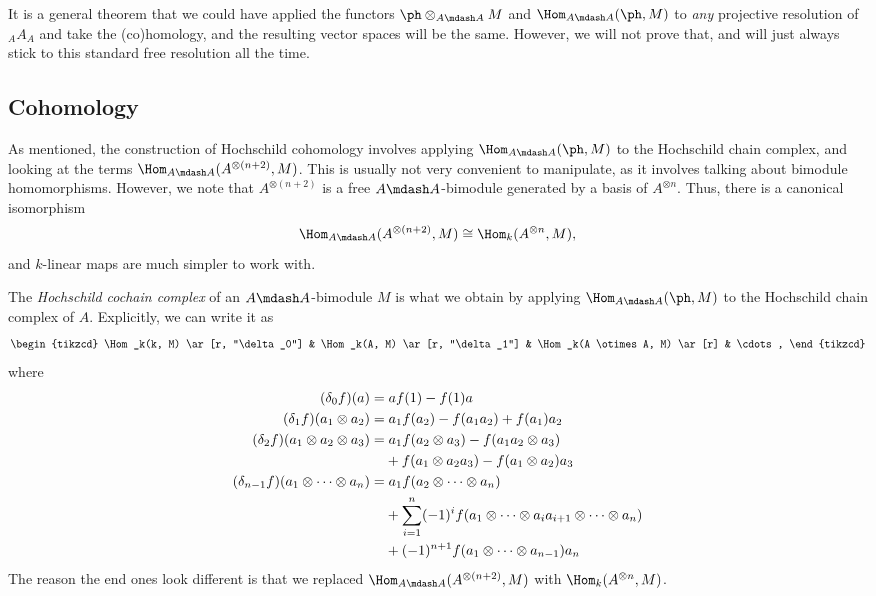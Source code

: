 \documentclass[a4paper]{article}
\begin{document}
It is a general theorem that we could have applied the functors $\ph \otimes_{A \mdash A} M$ and $\Hom_{A \mdash A} (\ph, M)$ to \emph{any} projective resolution of $_AA_A$ and take the (co)homology, and the resulting vector spaces will be the same. However, we will not prove that, and will just always stick to this standard free resolution all the time.

\subsection{Cohomology}
As mentioned, the construction of Hochschild cohomology involves applying $\Hom_{A\mdash A}(\ph, M)$ to the Hochschild chain complex, and looking at the terms $\Hom_{A\mdash A}(A^{\otimes(n + 2)}, M)$. This is usually not very convenient to manipulate, as it involves talking about bimodule homomorphisms. However, we note that $A^{\otimes (n + 2)}$ is a free $A\mdash A$-bimodule generated by a basis of $A^{\otimes n}$. Thus, there is a canonical isomorphism
\[
  \Hom_{A \mdash A}(A^{\otimes (n + 2)}, M)\cong \Hom_k(A^{\otimes n}, M),
\]
and $k$-linear maps are much simpler to work with.

\begin{defi}
  The \emph{Hochschild cochain complex} of an $A\mdash A$-bimodule $M$ is what we obtain by applying $\Hom_{A\mdash A}(\ph, M)$ to the Hochschild chain complex of $A$. Explicitly, we can write it as
  \[
    \begin{tikzcd}
      \Hom_k(k, M) \ar[r, "\delta_0"] & \Hom_k(A, M) \ar[r, "\delta_1"] & \Hom_k(A \otimes A, M) \ar[r] & \cdots,
    \end{tikzcd}
  \]
  where
  \begin{align*}
    (\delta_0 f)(a) &= a f(1) - f(1) a\\
    (\delta_1 f)(a_1 \otimes a_2) &= a_1 f(a_2) - f(a_1 a_2) + f(a_1) a_2\\
    (\delta_2 f)(a_1 \otimes a_2 \otimes a_3) &= a_1 f(a_2 \otimes a_3) - f(a_1a_2 \otimes a_3) \\
    &\hphantom{={}}+ f(a_1 \otimes a_2 a_3) - f(a_1 \otimes a_2)a_3\\
    (\delta_{n - 1} f)(a_1 \otimes \cdots \otimes a_n) &= a_1 f(a_2 \otimes \cdots \otimes a_n)\\
    &\hphantom{={}}+ \sum_{i = 1}^n (-1)^i f(a_1 \otimes \cdots \otimes a_i a_{i + 1} \otimes \cdots \otimes a_n) \\
    &\hphantom{={}}+ (-1)^{n + 1} f(a_1 \otimes \cdots \otimes a_{n - 1})a_n
  \end{align*}
  The reason the end ones look different is that we replaced $\Hom_{A\mdash A}(A^{\otimes (n + 2)}, M)$ with $\Hom_k(A^{\otimes n}, M)$.
\end{defi}
\end{document}
